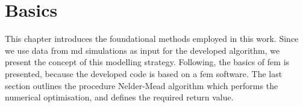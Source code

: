 



\chapter{Basics} \label{chap: basics}

This chapter introduces the foundational methods employed in this work. Since we use data from \acrfull{md} simulations as input for the developed algorithm, we present the concept of this modelling strategy. Following, the basics of \acrshort{fem} is presented, because the developed code is based on a \acrshort{fem} software. The last section outlines the procedure Nelder-Mead algorithm which performs the numerical optimisation, and defines the required return value.


